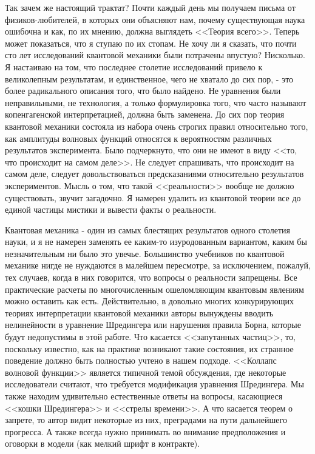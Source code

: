 \documentclass[main.tex]{subfiles}
\begin{document}
Так зачем же настоящий трактат? Почти каждый день мы получаем письма от физиков-любителей, в которых они объясняют нам, почему существующая наука ошибочна и как, по их мнению, должна выглядеть <<Теория всего>>. Теперь может показаться, что я ступаю по их стопам. Не хочу ли я сказать, что почти сто лет исследований квантовой механики были потрачены впустую? Нисколько. Я настаиваю на том, что последнее столетие исследований привело к великолепным результатам, и единственное, чего не хватало до сих пор, - это более радикального описания того, что было найдено. Не уравнения были неправильными, не технология, а только формулировка того, что часто называют копенгагенской интерпретацией, должна быть заменена. До сих пор теория квантовой механики состояла из набора очень строгих правил относительно того, как амплитуды волновых функций относятся к вероятностям различных результатов эксперимента. Было подчеркнуто, что они не имеют в виду <<то, что происходит на самом деле>>. Не следует спрашивать, что происходит на самом деле, следует довольствоваться предсказаниями относительно результатов экспериментов. Мысль о том, что такой <<реальности>> вообще не должно существовать, звучит загадочно. Я намерен удалить из квантовой теории все до единой частицы мистики и вывести факты о реальности.

Квантовая механика - один из самых блестящих результатов одного столетия науки, и я не намерен заменять ее каким-то изуродованным вариантом, каким бы незначительным ни было это увечье. Большинство учебников по квантовой механике нигде не нуждаются в малейшем пересмотре, за исключением, пожалуй, тех случаев, когда в них говорится, что вопросы о реальности запрещены. Все практические расчеты по многочисленным ошеломляющим квантовым явлениям можно оставить как есть. Действительно, в довольно многих конкурирующих теориях интерпретации квантовой механики авторы вынуждены вводить нелинейности в уравнение Шредингера или нарушения правила Борна, которые будут недопустимы в этой работе. Что касается <<запутанных частиц>>, то, поскольку известно, как на практике возникают такие состояния, их странное поведение должно быть полностью учтено в нашем подходе. <<Коллапс волновой функции>> является типичной темой обсуждения, где некоторые исследователи считают, что требуется модификация уравнения Шредингера. Мы также находим удивительно естественные ответы на вопросы, касающиеся <<кошки Шредингера>> и <<стрелы времени>>. А что касается теорем о запрете, то автор видит некоторые из них, преградами на пути дальнейшего прогресса. А также всегда нужно принимать во внимание предположения и оговорки в модели (как мелкий шрифт в контракте).  
\end{document}
